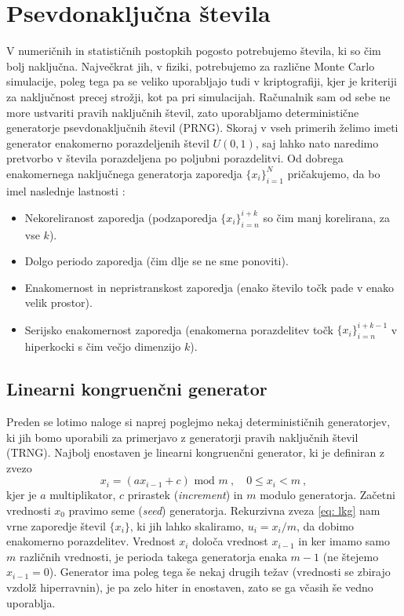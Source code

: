 \documentclass[11pt, oneside]{article}
\theoremstyle{definition}
\begin{document}
\newpage

\section{Psevdonaključna števila}
V numeričnih in statističnih postopkih pogosto potrebujemo števila, ki so čim bolj naključna.
Največkrat jih, v fiziki, potrebujemo za različne Monte Carlo simulacije, poleg tega pa se veliko uporabljajo tudi
v kriptografiji, kjer je kriteriji za naključnost precej strožji, kot pa pri simulacijah.
Računalnik sam od sebe ne more ustvariti pravih naključnih števil, zato uporabljamo deterministične generatorje
psevdonaključnih števil (PRNG). Skoraj v vseh primerih želimo imeti generator enakomerno porazdeljenih števil $U(0, 1)$, saj
lahko nato naredimo pretvorbo v števila porazdeljena po poljubni porazdelitvi.
Od dobrega enakomernega naključnega generatorja zaporedja $\{ x_i \}_{i=1}^N$ pričakujemo, da bo imel naslednje lastnosti \cite{sirca_verjetnost}:
\begin{itemize}
    \item Nekoreliranost zaporedja (podzaporedja $\{ x_i \}_{i=n}^{i+k}$ so čim manj korelirana, za vse $k$).
    \item Dolgo periodo zaporedja (čim dlje se ne sme ponoviti).
    \item Enakomernost in nepristranskost zaporedja (enako število točk pade v enako velik prostor).
    \item Serijsko enakomernost zaporedja (enakomerna porazdelitev točk $\{ x_i \}_{i=n}^{i+k-1}$ v hiperkocki s čim večjo dimenzijo $k$).
\end{itemize}

\subsection{Linearni kongruenčni generator}
Preden se lotimo naloge si naprej poglejmo nekaj determinističnih generatorjev,
ki jih bomo uporabili za primerjavo z generatorji pravih naključnih števil (TRNG).
Najbolj enostaven je linearni kongruenčni generator, ki je definiran z zvezo
\begin{equation}
    \label{eq: lkg}
    x_i = (ax_{i-1} + c) \text{ mod } m \>, \quad 0 \leq x_i < m \>,
\end{equation}
kjer je $a$ multiplikator, $c$ prirastek (\emph{increment}) in $m$ modulo generatorja.
Začetni vrednosti $x_0$ pravimo seme (\emph{seed}) generatorja. Rekurzivna zveza \ref{eq: lkg} nam vrne zaporedje
števil $\{ x_i \}$, ki jih lahko skaliramo, $u_i=x_i/m$, da dobimo enakomerno porazdelitev.
Vrednost $x_i$ določa vrednost $x_{i-1}$ in ker imamo samo $m$ različnih vrednosti, je perioda takega
generatorja enaka $m-1$ (ne štejemo $x_{i-1}=0$). Generator ima poleg tega še nekaj drugih težav
(vrednosti se zbirajo vzdolž hiperravnin), je pa zelo hiter in enostaven, zato se ga včasih še vedno uporablja.
\end{document}

